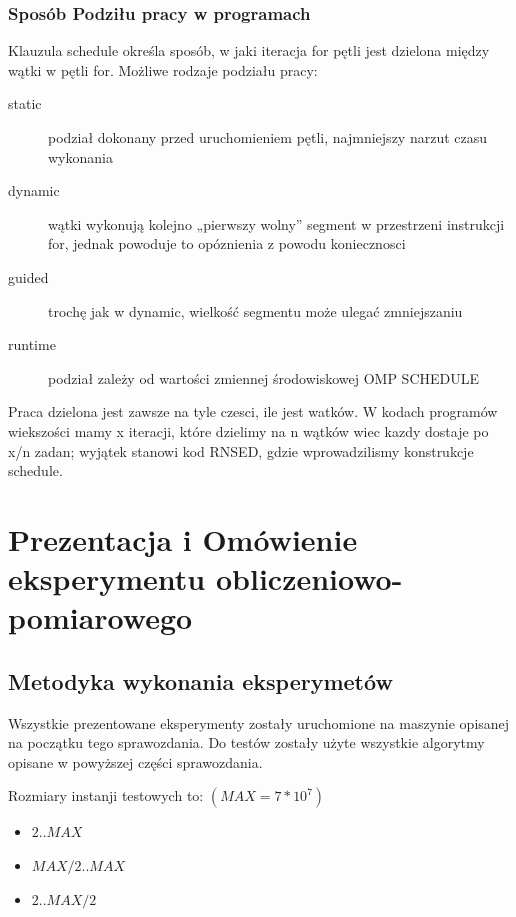 \documentclass{article}
\begin{document}
            \subsubsection{Sposób Podziłu pracy w programach}
                Klauzula schedule określa sposób, w jaki iteracja for pętli jest dzielona między wątki w pętli for. Możliwe rodzaje podziału pracy:
                \begin{description}
                    \item[static] podział dokonany przed uruchomieniem pętli, najmniejszy narzut czasu wykonania
                    \item[dynamic] wątki wykonują kolejno „pierwszy wolny” segment w przestrzeni instrukcji for, jednak powoduje to opóznienia z powodu 
                    koniecznosci 
                    \item[guided] trochę jak w dynamic, wielkość segmentu może ulegać zmniejszaniu
                    \item[runtime] podział zależy od wartości zmiennej środowiskowej OMP SCHEDULE
                \end{description}
            
            Praca dzielona jest zawsze na tyle czesci, ile jest watków. W kodach programów wiekszości mamy x iteracji, które dzielimy na n wątków wiec kazdy dostaje po x/n zadan; wyjątek stanowi kod RNSED, gdzie wprowadzilismy konstrukcje schedule.
                        
    \section{Prezentacja i Omówienie eksperymentu obliczeniowo-pomiarowego}
        \subsection{Metodyka wykonania eksperymetów}
                Wszystkie prezentowane eksperymenty zostały uruchomione na maszynie opisanej na początku tego sprawozdania. Do testów zostały użyte wszystkie algorytmy opisane w powyższej części sprawozdania.
                
                \noindent
                Rozmiary instanji testowych to: $(MAX = 7 * 10^7)$
                \begin{itemize}
                    \item $2 .. MAX$
                    \item $MAX / 2 .. MAX$
                    \item $2 .. MAX / 2$
                \end{itemize}
                
\end{document}
